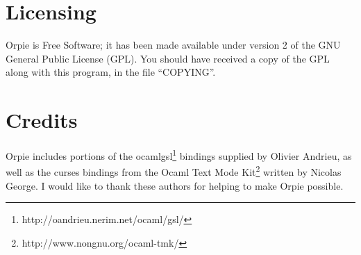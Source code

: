 \documentclass[11pt,notitlepage]{article}
\begin{document}
\section{Licensing}
Orpie is Free Software; it has been made available under version 2 of the GNU
General Public License (GPL).  You should have received a copy of the GPL along
with this program, in the file ``COPYING''.


\section{Credits}
Orpie includes portions of the
ocamlgsl\footnote{http://oandrieu.nerim.net/ocaml/gsl/} 
bindings supplied by Olivier Andrieu, as well as the curses bindings from the
Ocaml Text Mode Kit\footnote{http://www.nongnu.org/ocaml-tmk/} 
written by Nicolas George.  I would like to thank these authors for helping to
make Orpie possible.
\end{document}
